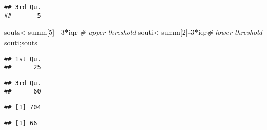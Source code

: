 \documentclass[12pt,]{article}
\newenvironment{Shaded}{\begin{snugshade}}{\end{snugshade}}
\newcommand{\CommentTok}[1]{\textcolor[rgb]{0.56,0.35,0.01}{\textit{#1}}}
\newcommand{\DecValTok}[1]{\textcolor[rgb]{0.00,0.00,0.81}{#1}}
\newcommand{\KeywordTok}[1]{\textcolor[rgb]{0.13,0.29,0.53}{\textbf{#1}}}
\newcommand{\NormalTok}[1]{#1}
\newcommand{\OperatorTok}[1]{\textcolor[rgb]{0.81,0.36,0.00}{\textbf{#1}}}
\begin{document}
\begin{verbatim}
## 3rd Qu. 
##       5
\end{verbatim}

\begin{Shaded}
\begin{Highlighting}[]
\NormalTok{souts<-summ[}\DecValTok{5}\NormalTok{]}\OperatorTok{+}\DecValTok{3}\OperatorTok{*}\NormalTok{iqr  }\CommentTok{# upper threshold}
\NormalTok{souti<-summ[}\DecValTok{2}\NormalTok{]}\OperatorTok{-}\DecValTok{3}\OperatorTok{*}\NormalTok{iqr}\CommentTok{# lower threshold}
\NormalTok{souti;souts}
\end{Highlighting}
\end{Shaded}

\begin{verbatim}
## 1st Qu. 
##      25
\end{verbatim}

\begin{verbatim}
## 3rd Qu. 
##      60
\end{verbatim}

\begin{Shaded}
\end{Shaded}

\begin{verbatim}
## [1] 704
\end{verbatim}

\begin{Shaded}
\end{Shaded}

\begin{verbatim}
## [1] 66
\end{verbatim}
\end{document}
